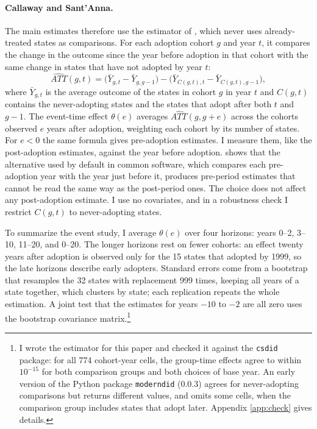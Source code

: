 \documentclass[12pt]{article}
\begin{document}
\paragraph{Callaway and Sant'Anna.} The main estimates therefore use the estimator of
\citet{callaway2021difference}, which never uses already-treated states as comparisons. For each adoption
cohort $g$ and year $t$, it compares the change in the outcome since the year before adoption in that cohort
with the same change in states that have not adopted by year $t$:
\begin{equation}\label{eq:attgt}
\widehat{ATT}(g,t) = \Big(\bar Y_{g,t} - \bar Y_{g,g-1}\Big) - \Big(\bar Y_{C(g,t),t} - \bar Y_{C(g,t),g-1}\Big),
\end{equation}
where $\bar Y_{g,t}$ is the average outcome of the states in cohort $g$ in year $t$ and $C(g,t)$ contains the
never-adopting states and the states that adopt after both $t$ and $g-1$. The event-time effect $\theta(e)$
averages $\widehat{ATT}(g, g+e)$ across the cohorts observed $e$ years after adoption, weighting each cohort by
its number of states. For $e<0$ the same formula gives pre-adoption estimates. I measure them, like the
post-adoption estimates, against the year before adoption. \citet{roth2024interpreting} shows that the
alternative used by default in common software, which compares each pre-adoption year with the year just before
it, produces pre-period estimates that cannot be read the same way as the post-period ones. The choice does not
affect any post-adoption estimate. I use no covariates, and in a robustness check I restrict $C(g,t)$ to
never-adopting states.

To summarize the event study, I average $\theta(e)$ over four horizons: years 0--2, 3--10, 11--20, and 0--20.
The longer horizons rest on fewer cohorts: an effect twenty years after adoption is observed only for the 15
states that adopted by 1999, so the late horizons describe early adopters. Standard errors come from a
bootstrap that resamples the 32 states with replacement 999 times, keeping all years of a state together,
which clusters by state; each replication repeats the whole estimation. A joint test that the estimates for
years $-10$ to $-2$ are all zero uses the bootstrap covariance matrix.\footnote{I wrote the estimator for this
paper and checked it against the \texttt{csdid} package: for all 774 cohort-year cells, the group-time effects
agree to within $10^{-15}$ for both comparison groups and both choices of base year. An early version of the
Python package \texttt{moderndid} (0.0.3) agrees for never-adopting comparisons but returns different values,
and omits some cells, when the comparison group includes states that adopt later. Appendix \ref{app:check}
gives details.}
\end{document}
